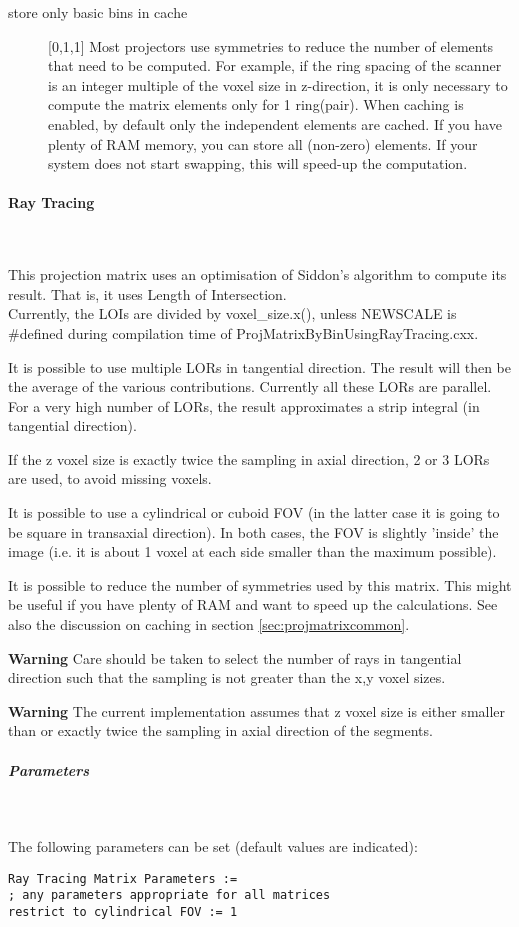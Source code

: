 \documentclass{article}
\newcommand{\subsubsubsection}[1]{\paragraph{#1}\mbox{} \\}
\newcommand{\subsubsubsubsection}[1]{\subparagraph{#1} \mbox{} \\}
\begin{document}
{{{\begin{description}
\item[store only basic bins in cache] [0,1,1{]}
Most projectors use symmetries to reduce the number of elements 
that need to be computed. For example, if the ring spacing of 
the scanner is an integer multiple of the voxel size in z-direction, 
it is only necessary to compute the matrix elements only for 
1 ring(pair). When caching is enabled, by default only the independent 
elements are cached. If you have plenty of RAM memory, you can 
store all (non-zero) elements. If your system does not start 
swapping, this will speed-up the computation.
\end{description}

{ \subsubsubsection{Ray Tracing}
}
\label{sec:projmatrixusingraytracing}
This projection matrix uses an optimisation of Siddon's algorithm 
to compute its result. That is, it uses Length of Intersection.\\
Currently, the LOIs are divided by voxel\_size.x(), unless NEWSCALE 
is \#defined during compilation time of ProjMatrixByBinUsingRayTracing.cxx. 

It is possible to use multiple LORs in tangential direction. 
The result will then be the average of the various contributions. 
Currently all these LORs are parallel. For a very high number 
of LORs, the result approximates a strip integral (in tangential 
direction).

If the z voxel size is exactly twice the sampling in axial direction, 
2 or 3 LORs are used, to avoid missing voxels. 

It is possible to use a cylindrical or cuboid FOV (in the latter 
case it is going to be square in transaxial direction). In both 
cases, the FOV is slightly 'inside' the image (i.e. it is about 
1 voxel at each side smaller than the maximum possible).

It is possible to reduce the number of symmetries used by this 
matrix. This might be useful if you have plenty of RAM and want 
to speed up the calculations. See also the discussion on caching 
in section \ref{sec:projmatrixcommon}.

\textbf{Warning} Care should be taken to select the number of rays 
in tangential direction such that the sampling is not greater 
than the x,y voxel sizes.

\textbf{Warning} The current implementation assumes that z voxel size 
is either smaller than or exactly twice the sampling in axial 
direction of the segments.

{ \subsubsubsubsection{Parameters}
}
The following parameters can be set (default values are indicated):
\begin{verbatim}
Ray Tracing Matrix Parameters := 
; any parameters appropriate for all matrices
restrict to cylindrical FOV := 1


\end{verbatim}}}}
\end{document}
